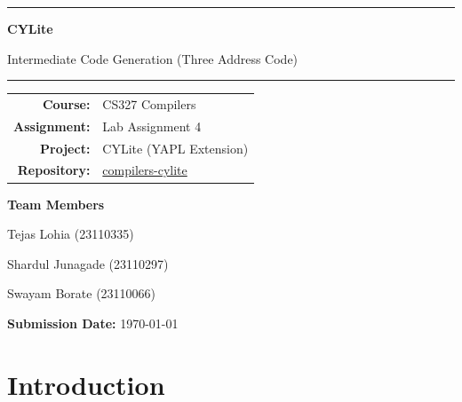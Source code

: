 \documentclass[a4paper,12pt]{article}
\begin{document}
\begin{titlepage}
    \centering
    \vspace*{1.2cm}

    \vspace{0.9cm}
    \rule{0.9\textwidth}{0.8pt}
    \vspace{0.6cm}

    {\Huge \textbf{CYLite} \par}
    \vspace{0.45cm}
    {\LARGE Intermediate Code Generation (Three Address Code) \par}
    \vspace{0.6cm}

    \rule{0.9\textwidth}{0.8pt}

    \vspace{1.4cm}
    \begin{tabular}{rl}
        \textbf{Course:} & CS327 Compilers \\
        \textbf{Assignment:} & Lab Assignment 4 \\
        \textbf{Project:} & CYLite (YAPL Extension) \\
        \textbf{Repository:} & \href{https://github.com/ShardulJunagade/compilers-cylite}{compilers-cylite} \\
    \end{tabular}

    \vspace{1.4cm}
    {\Large \textbf{Team Members} \par}
    \vspace{0.4cm}
    {\large Tejas Lohia \hspace{0.4cm} (23110335) \par}
    {\large Shardul Junagade \hspace{0.4cm} (23110297) \par}
    {\large Swayam Borate \hspace{0.4cm} (23110066) \par}

    \vfill
    {\large \textbf{Submission Date:} \today \par}
\end{titlepage}

\tableofcontents
\newpage


\section{Introduction}
\end{document}
